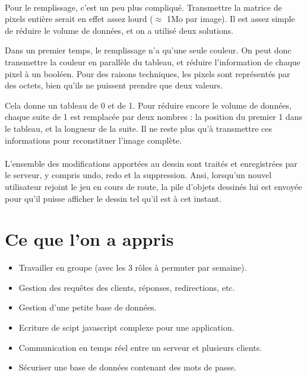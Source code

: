 \documentclass[11pt,a4paper]{article}
\begin{document}
                \paragraph{}
                Pour le remplissage, c'est un peu plus compliqué.
                Transmettre la matrice de pixels entière serait en effet assez lourd ($\approx$ 1Mo par image).
                Il est assez simple de réduire le volume de données, et on a utilisé deux solutions.
                
                Dans un premier temps, le remplissage n'a qu'une seule couleur.
                On peut donc transmettre la couleur en parallèle du tableau,
                et réduire l'information de chaque pixel à un booléen.
                Pour des raisons techniques, les pixels sont représentés par des octets,
                bien qu'ils ne puissent prendre que deux valeurs.

                Cela donne un tableau de 0 et de 1.
                Pour réduire encore le volume de données,
                chaque suite de 1 est remplacée par deux nombres :
                la position du premier 1 dans le tableau, et la longueur de la suite.
                Il ne reste plus qu'à transmettre ces informations pour reconstituer l'image complète.
                \paragraph{}
                L'ensemble des modifications apportées au dessin sont traités et enregistrées par le serveur,
                y compris undo, redo et la suppression.
                Ansi, lorsqu'un nouvel utilisateur rejoint le jeu en cours de route,
                la pile d'objets dessinés lui est envoyée pour qu'il puisse afficher le dessin tel qu'il est à cet instant.

    \section{Ce que l'on a appris}
        \begin{itemize}
            \item Travailler en groupe (avec les 3 rôles à permuter par semaine).
            \item Gestion des requêtes des clients, réponses, redirections, etc.
            \item Gestion d'une petite base de données.
            \item Ecriture de scipt javascript complexe pour une application.
            \item Communication en temps réel entre un serveur et plusieurs clients.
            \item Sécuriser une base de données contenant des mots de passe.
        \end{itemize}
\end{document}
